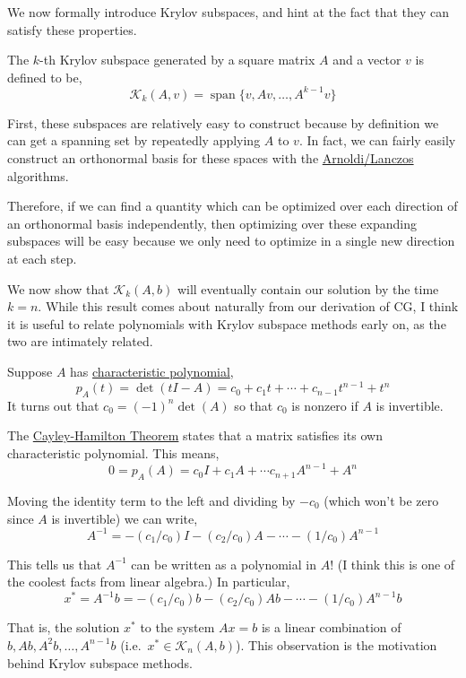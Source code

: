 \documentclass[10pt]{article}
\begin{document}
We now formally introduce Krylov subspaces, and hint at the fact that they can satisfy these properties.

The \(k\)-th Krylov subspace generated by a square matrix \(A\) and a vector \(v\) is defined to be,
\[
\mathcal{K}_k(A,v) = \operatorname{span}\{v,Av,\ldots,A^{k-1}v \}
\]

First, these subspaces are relatively easy to construct because by definition we can get a spanning set by repeatedly applying \(A\) to \(v\).
In fact, we can fairly easily construct an orthonormal basis for these spaces with the \href{./arnoldi_lanczos.html}{Arnoldi/Lanczos} algorithms.

Therefore, if we can find a quantity which can be optimized over each direction of an orthonormal basis independently, then optimizing over these expanding subspaces will be easy because we only need to optimize in a single new direction at each step.

We now show that \(\mathcal{K}_k(A,b)\) will eventually contain our solution by the time \(k=n\).
While this result comes about naturally from our derivation of CG, I think it is useful to relate polynomials with Krylov subspace methods early on, as the two are intimately related.

Suppose \(A\) has \href{https://en.wikipedia.org/wiki/Characteristic_polynomial\#Characteristic_equation}{characteristic polynomial},
\[
p_A(t) = \det(tI-A) = c_0 + c_1t + \cdots + c_{n-1}t^{n-1} + t^n
\]
It turns out that \(c_0 = (-1)^n\det(A)\) so that \(c_0\) is nonzero if \(A\) is invertible.

The \href{https://en.wikipedia.org/wiki/Cayley\%E2\%80\%93Hamilton_theorem}{Cayley-Hamilton Theorem} states that a matrix satisfies its own characteristic polynomial.
This means,
\[
0 = p_A(A) = c_0 I + c_1 A + \cdots c_{n+1} A^{n-1} + A^n
\]

Moving the identity term to the left and dividing by \(-c_0\) (which won't be zero since \(A\) is invertible) we can write,
\[
A^{-1} = -(c_1/c_0) I - (c_2/c_0) A - \cdots - (1/c_0) A^{n-1}
\]

This tells us that \(A^{-1}\) can be written as a polynomial in \(A\)! (I think this is one of the coolest facts from linear algebra.) In particular,\\
\[
x^* = A^{-1}b = -(c_1/c_0) b - (c_2/c_0) Ab - \cdots - (1/c_0) A^{n-1}b
\]

That is, the solution \(x^*\) to the system \(Ax = b\) is a linear combination of \(b, Ab, A^2b, \ldots, A^{n-1}b\) (i.e.~\(x^*\in\mathcal{K}_n(A,b)\)).
This observation is the motivation behind Krylov subspace methods.
\end{document}
